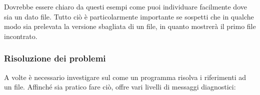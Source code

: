 \documentclass{article}
\begin{document}
Dovrebbe essere chiaro da questi esempi come puoi individuare facilmente
dove sia un dato file. Tutto ciò è particolarmente importante se
sospetti che in qualche modo sia prelevata la versione sbagliata di un
file, in quanto  mostrerà il primo file incontrato.

\subsubsection{Risoluzione dei problemi}
\label{sec:debugging}

A volte è necessario investigare sul come un programma risolva i
riferimenti ad un file. Affinché sia pratico fare ciò, \KPS{} offre vari
livelli di messaggi diagnostici:
\end{document}

